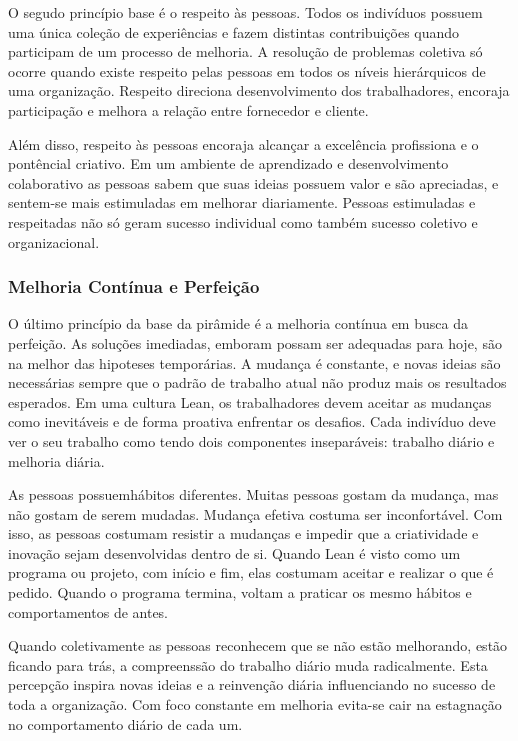 O segudo princípio base é o respeito às pessoas. Todos os indivíduos possuem uma única coleção de experiências e fazem distintas contribuições quando participam de um processo de melhoria. A resolução de problemas coletiva só ocorre quando existe respeito pelas pessoas em todos os níveis hierárquicos de uma organização. Respeito direciona desenvolvimento dos trabalhadores, encoraja participação e melhora a relação entre fornecedor e cliente.

Além disso, respeito às pessoas encoraja alcançar a excelência profissiona e o pontêncial criativo. Em um ambiente de aprendizado e desenvolvimento colaborativo as pessoas sabem que suas ideias possuem valor e são apreciadas, e sentem-se mais estimuladas em melhorar diariamente. Pessoas estimuladas e respeitadas não só geram sucesso individual como também sucesso coletivo e organizacional.


\subsubsection[Melhoria Contínua e Perfeição]{Melhoria Contínua e Perfeição}

O último princípio da base da pirâmide é a melhoria contínua em busca da perfeição.  As soluções imediadas, emboram possam ser adequadas para hoje, são na melhor das hipoteses temporárias.  A mudança é constante, e novas ideias são necessárias  sempre que o padrão de trabalho atual não produz mais os resultados esperados. Em uma cultura Lean, os trabalhadores devem aceitar as mudanças como inevitáveis e de forma proativa enfrentar os desafios. Cada indivíduo deve ver o seu trabalho como tendo dois componentes inseparáveis: trabalho diário e melhoria diária.

As pessoas possuemhábitos diferentes. Muitas pessoas gostam da mudança, mas não gostam de serem mudadas. Mudança efetiva costuma ser inconfortável.  Com isso, as pessoas costumam resistir a mudanças e impedir que a criatividade e inovação sejam desenvolvidas dentro de si.  Quando Lean é visto como um programa ou projeto, com início e fim, elas costumam aceitar e realizar o que é pedido. Quando o programa termina, voltam a praticar os mesmo hábitos e comportamentos de antes.

Quando coletivamente as pessoas reconhecem que se não estão melhorando, estão ficando para trás, a compreenssão do trabalho diário muda radicalmente. Esta percepção inspira novas ideias e a reinvenção diária influenciando no sucesso de toda a organização. Com foco constante em melhoria evita-se cair na estagnação no comportamento diário de cada um.


